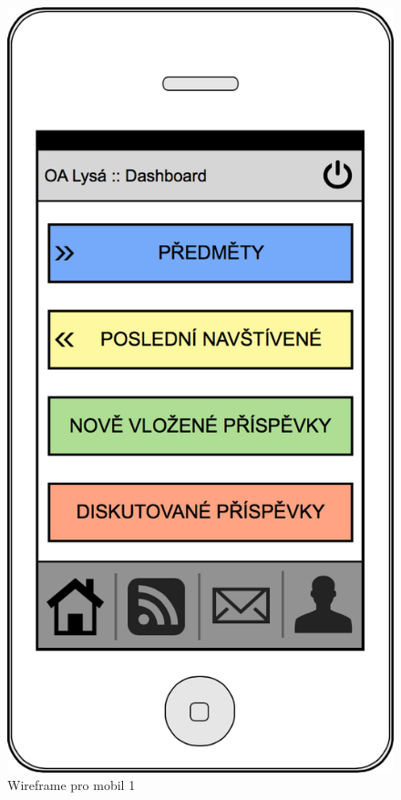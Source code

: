 \documentclass[thesis=B,czech]{FITthesis}[2012/06/26]
\begin{document}
\begin{figure}
  \centering
	\includegraphics[scale=0.35]{wireframe_phone_dashboard.png}
	\caption{Wireframe pro mobil 1} \label{fig:wireframemobil1} 

\end{figure}
\end{document}
